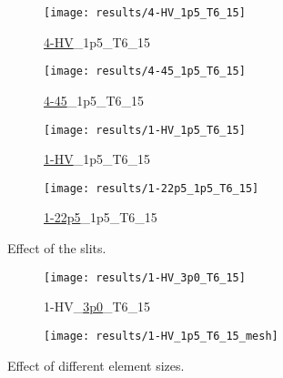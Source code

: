 \begin{figure}
    \centering
    \begin{subfigure}[b]{0.45\textwidth}
        \centering
        \texttt{[image: results/4-HV\_1p5\_T6\_15]}
        \caption{\textcolor{tab:red}{\underline{4-HV}}\_1p5\_T6\_15}
        \label{fig:4-HV_1p5_T6_15}
    \end{subfigure}
    \begin{subfigure}[b]{0.45\textwidth}
        \centering
        \texttt{[image: results/4-45\_1p5\_T6\_15]}
        \caption{\textcolor{tab:red}{\underline{4-45}}\_1p5\_T6\_15}
        \label{fig:4-45_1p5_T6_15}
    \end{subfigure}
    \begin{subfigure}[b]{0.45\textwidth}
        \centering
        \texttt{[image: results/1-HV\_1p5\_T6\_15]}
        \caption{\textcolor{tab:red}{\underline{1-HV}}\_1p5\_T6\_15}
        \label{fig:1-HV_1p5_T6_15}
    \end{subfigure}
    \begin{subfigure}[b]{0.45\textwidth}
        \centering
        \texttt{[image: results/1-22p5\_1p5\_T6\_15]}
        \caption{\textcolor{tab:red}{\underline{1-22p5}}\_1p5\_T6\_15}
        \label{fig:1-22p5_1p5_T6_15}
    \end{subfigure}
    \caption{Effect of the slits.}
    \label{fig:effect_slit}
\end{figure}

\begin{figure}
    \centering
    \begin{subfigure}[b]{0.45\textwidth}
        \centering
        \texttt{[image: results/1-HV\_3p0\_T6\_15]}
        \caption{1-HV\_\textcolor{tab:red}{\underline{3p0}}\_T6\_15}
        \label{fig:1-HV_3p0_T6_15}
    \end{subfigure}
    \begin{subfigure}[b]{0.45\textwidth}
        \centering
        \texttt{[image: results/1-HV\_1p5\_T6\_15\_mesh]}
        \caption{}
        \label{fig:1-HV_1p5_T6_15_mesh}
    \end{subfigure}
    \caption{Effect of different element sizes.}
    \label{fig:effect_element}
\end{figure}


